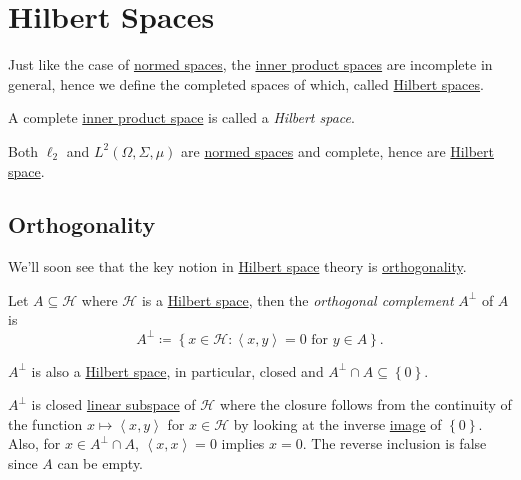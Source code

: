 \section{Hilbert Spaces}
Just like the case of \hyperref[def:normed-vector-space]{normed spaces}, the \hyperref[def:inner-product-space]{inner product spaces} are incomplete in general, hence we define the completed spaces of which, called \hyperref[def:Hilbert-space]{Hilbert spaces}.
\begin{definition}\label{def:Hilbert-space}
	A complete \hyperref[def:inner-product-space]{inner product space} is called a \emph{Hilbert space}.
\end{definition}

\begin{eg}
	Both \(\ell _2\) and \(L^2(\Omega , \Sigma , \mu )\) are \hyperref[def:normed-vector-space]{normed spaces} and complete, hence are \hyperref[def:Hilbert-space]{Hilbert space}.
\end{eg}

\subsection{Orthogonality}
We'll soon see that the key notion in \hyperref[def:Hilbert-space]{Hilbert space} theory is \hyperref[def:orthogonal]{orthogonality}.
\begin{definition}\label{def:orthogonal-complement}
	Let \(A \subseteq \mathcal{H} \) where \(\mathcal{H}\) is a \hyperref[def:Hilbert-space]{Hilbert space}, then the \emph{orthogonal complement} \(A^\perp\) of \(A\) is
	\[
		A^\perp \coloneqq \left\{ x\in \mathcal{H} \colon \left\langle x, y \right\rangle = 0 \text{ for } y\in A \right\}.
	\]
\end{definition}

\begin{remark}
	\(A^\perp\) is also a \hyperref[def:Hilbert-space]{Hilbert space}, in particular, closed and \(A^\perp \cap A \subseteq \left\{ 0 \right\} \).
\end{remark}
\begin{explanation}
	\(A^\perp\) is closed \hyperref[def:linear-vector-space]{linear subspace} of \(\mathcal{H} \) where the closure follows from the continuity of the function \(x\mapsto \left\langle x, y \right\rangle \) for \(x\in \mathcal{H} \) by looking at the inverse \hyperref[def:image]{image} of \(\left\{ 0 \right\}\). Also, for \(x\in A^\perp \cap A\), \(\left\langle x, x \right\rangle = 0\) implies \(x = 0\). The reverse inclusion is false since \(A\) can be empty.
\end{explanation}

